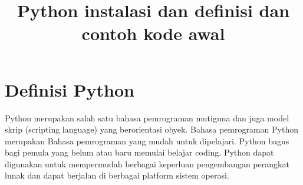 \documentclass[12pt, times new roman, a4paper]{article}
\begin{document}
\title{Python instalasi dan definisi dan contoh kode awal}
\maketitle

\section{Definisi Python}

Python merupakan salah satu bahasa pemrograman mutiguna dan juga model skrip (scripting language) yang berorientasi obyek. Bahasa pemrograman Python merupakan Bahasa pemrograman yang mudah untuk dipelajari. Python bagus bagi pemula yang belum atau baru memulai belajar coding. Python dapat digunakan untuk mempermudah berbagai keperluan pengembangan perangkat lunak dan dapat berjalan di berbagai platform sistem operasi.
\end{document}
